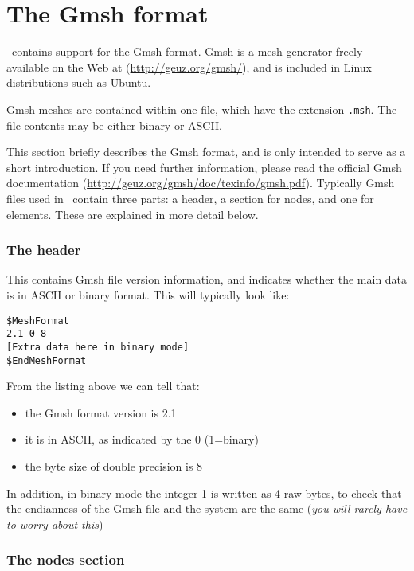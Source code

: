 \section{The Gmsh format}\label{sec:gmsh_format}

\fluidity\ contains  support for the Gmsh format. Gmsh is a mesh
generator freely available on the Web at (\url{http://geuz.org/gmsh/}), and 
is included in Linux distributions such as Ubuntu. 

Gmsh meshes are contained within one file, which have
the extension \lstinline[language=bash]+.msh+. The file contents may
be either binary or ASCII.

This section briefly describes the Gmsh format, and is only intended
to serve as a short introduction. If you need further
information, please read the official Gmsh documentation
(\url{http://geuz.org/gmsh/doc/texinfo/gmsh.pdf}).
Typically Gmsh files used in \fluidity\ contain three parts: a header, a
section for nodes, and one for elements. These  are explained in more
detail below.

\subsubsection*{The header}\label{sec:gmsh_header_section}
This contains Gmsh file version information, and indicates whether 
the main data is in ASCII or binary format. This will typically look like:
\begin{lstlisting}
$MeshFormat
2.1 0 8
[Extra data here in binary mode]
$EndMeshFormat
\end{lstlisting}

From the listing above we can tell that:
\begin{itemize}
\item the Gmsh format version is 2.1
\item it is in ASCII, as indicated by the 0 (1=binary)
\item the byte size of double precision is 8
\end{itemize}
In addition, in binary mode the integer 1 is written as 4 raw bytes, to check that the endianness of the Gmsh file and the system are the same (\textit{you will rarely have to worry about this})


\subsubsection*{The nodes section}\label{sec:gmsh_nodes_section}

